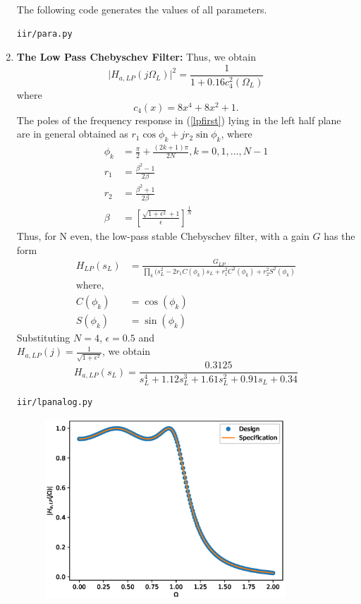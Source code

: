 \documentclass[journal,12pt,twocolumn]{IEEEtran}
\begin{document}
\begin{enumerate}
The following code generates the values of all parameters.
\begin{lstlisting}
iir/para.py
\end{lstlisting}
\item \textbf{The Low Pass Chebyschev Filter:} 
Thus, we obtain
\begin{equation}
\label{lpsqfinal}
\vert H_{a,LP}(j\Omega_L)\vert^2 = \frac{1}{1 + 0.16c_4^2(\Omega_L)}
\end{equation}
where
\begin{equation}
c_4(x) = 8x^4 + 8x^2 + 1.	
\end{equation}
The poles of the frequency response in (\ref{lpfirst}) lying in the left half plane are in general obtained as 
$r_1\cos\phi_k + jr_2\sin \phi_k$, where
\begin{align}
   \phi_k &= \frac{\pi}{2} + \frac{(2k+1)\pi}{2N}, k = 0, 1, \dots, N-1 \nonumber \\
r_1 &= \frac{\beta^2 - 1}{2\beta}\\
r_2 &= \frac{\beta^2 + 1}{2\beta}\\
\beta &= \left[ \frac{\sqrt{1 + \epsilon^2} + 1}{\epsilon}\right]^{\frac{1}{N}}
\end{align}
Thus, for N even, the low-pass stable Chebyschev filter, with a gain $G$ has the form
\begin{align}
\label{eq:poleleft}
H_{LP}(s_L) &= \frac{G_{LP}}{\prod_{k}^{}(s_L^2 - 2r_1 C(\phi_k)s_L + r_1^2C^2(\phi_k) + r_2^2 S^2(\phi_k)}\\
\text{where,}\\
C(\phi_k) &= \cos(\phi_k) \\
S(\phi_k) &= \sin(\phi_k)
\end{align}
Substituting $N = 4$, $\epsilon = 0.5$ and\\ $H_{a,LP}(j) = \frac{1}{\sqrt{1+\epsilon^2}}$, we obtain 
\begin{equation}
\label{lpfinal}
H_{a,LP}(s_L) = \frac{0.3125}{s_L^4 + 1.12s_L^3 + 1.61s_L^2+0.91s_L + 0.34}
\end{equation}
\begin{lstlisting}
iir/lpanalog.py
\end{lstlisting}
\begin{figure}[!ht]
    \centering
    \includegraphics[width=9cm]{./figs/iir/AnalogLP_cheb.eps}

\end{figure}
\end{enumerate}
\end{document}

